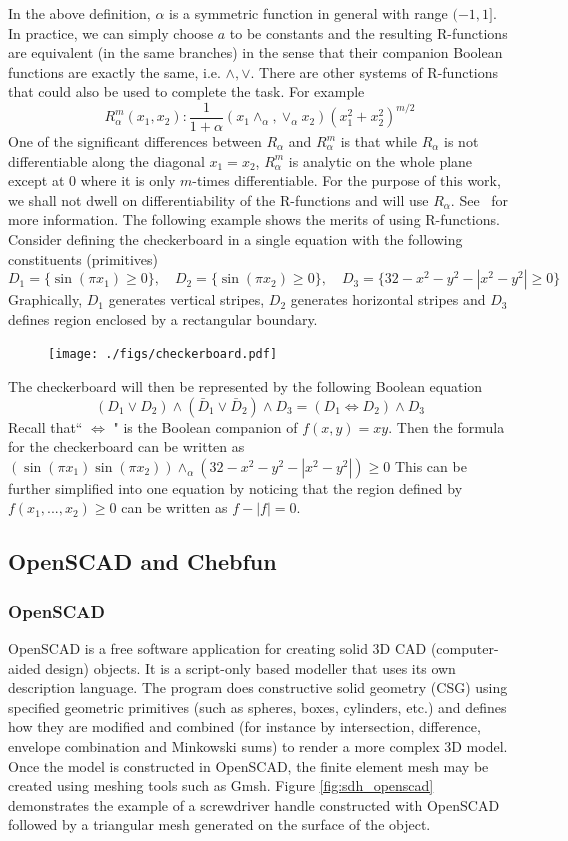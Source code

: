 \documentclass[11pt,reqno]{amsart}
\theoremstyle{definition}
\begin{document}
In the above definition, $\alpha$ is a symmetric function in general with range $(-1,1]$. In practice, we can simply choose $a$ to be constants and the resulting R-functions are equivalent (in the same branches) in the sense that their companion Boolean functions are exactly the same, i.e. $\wedge,\vee$. There are other systems of R-functions that could also be used to complete the task. For example
$$R_{\alpha}^m(x_1,x_2): \frac{1}{1+\alpha} (x_1 \wedge_\alpha ,\vee_\alpha x_2)(x_1^2+x_2^2)^{m/2}$$
One of the significant differences between $R_\alpha$ and $R_{\alpha}^{m}$ is that while $R_\alpha$ is not differentiable along the diagonal $x_1=x_2$, $R_{\alpha}^m$ is analytic on the whole plane except at $0$ where it is only $m$-times differentiable. For the purpose of this 
work, we shall not dwell on differentiability of the R-functions and will use $R_\alpha$. See~\cite{Shapiro} for more information.
The following example shows the merits of using R-functions. Consider defining the checkerboard in a single equation with the following constituents (primitives) 
$$D_1=\{\sin(\pi x_1)\geq 0\}, \quad D_2=\{\sin(\pi x_2)\geq 0\},\quad D_3=\{32-x^2-y^2-|x^2-y^2|\geq 0\}$$ 
Graphically, $D_1$ generates vertical stripes, $D_2$ generates horizontal stripes and $D_3$ defines region enclosed by a rectangular boundary. 
\begin{figure}
\texttt{[image: ./figs/checkerboard.pdf]}
\end{figure}

The checkerboard will then be represented by the following Boolean equation
$$(D_1\vee D_2)\wedge (\bar{D}_1\vee \bar{D}_2)\wedge D_3=(D_1\Leftrightarrow D_2)\wedge D_3$$
Recall that`` $\Leftrightarrow$ " is the Boolean companion of $f(x,y)=xy$. Then the formula for the checkerboard can be written as 
$(\sin(\pi x_1)\sin(\pi x_2)) \wedge_\alpha (32-x^2-y^2-|x^2-y^2|) \geq 0$
This can be further simplified into one equation by noticing that the region defined by $f(x_1,...,x_2)\geq 0$ can be written as $f-|f|= 0$.  

\subsection{OpenSCAD and Chebfun}
\subsubsection{OpenSCAD}
OpenSCAD is a free software application for creating solid 3D CAD
(computer-aided design) objects. It is a script-only based modeller that uses
its own description language. The program does constructive solid geometry
(CSG) using specified geometric primitives (such as spheres, boxes, cylinders,
etc.) and defines how they are modified and combined (for instance by
intersection, difference, envelope combination and Minkowski sums) to render a
more complex 3D model. Once the model is constructed in OpenSCAD, the finite element mesh may be created using meshing tools such as Gmsh. Figure \ref{fig:sdh_openscad} demonstrates the example of
a screwdriver handle constructed with OpenSCAD followed by a triangular mesh generated on
the surface of the object.
\end{document}
